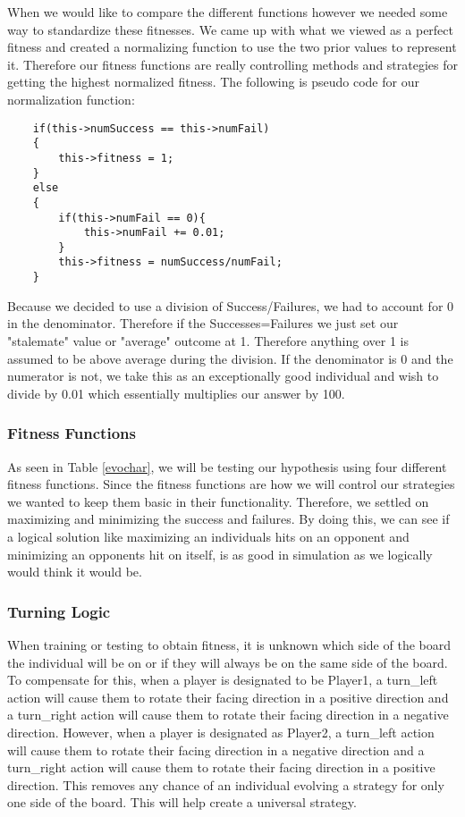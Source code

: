 \documentclass{acm_proc_article-sp}
\begin{document}
When we would like to compare the different functions however we needed some way to standardize these fitnesses. We came up with what we viewed as a perfect fitness and created a normalizing function to use the two prior values to represent it. Therefore our fitness functions are really controlling methods and strategies for getting the highest normalized fitness. The following is pseudo code for our normalization function:
\begin{verbatim}
    if(this->numSuccess == this->numFail)
    {
        this->fitness = 1;
    }
    else
    {
        if(this->numFail == 0){
            this->numFail += 0.01;
        }
        this->fitness = numSuccess/numFail;
    }
\end{verbatim}
Because we decided to use a division of Success/Failures, we had to account for 0 in the denominator. Therefore if the Successes=Failures we just set our "stalemate" value or "average" outcome at 1. Therefore anything over 1 is assumed to be above average during the division. If the denominator is 0 and the numerator is not, we take this as an exceptionally good individual and wish to divide by 0.01 which essentially multiplies our answer by 100.

\subsubsection{Fitness Functions}

As seen in Table \ref{evochar}, we will be testing our hypothesis using four different fitness functions. Since the fitness functions are how we will control our strategies we wanted to keep them basic in their functionality. Therefore, we settled on maximizing and minimizing the success and failures. By doing this, we can see if a logical solution like maximizing an individuals hits on an opponent and minimizing an opponents hit on itself, is as good in simulation as we logically would think it would be.

\subsubsection{Turning Logic} %

When training or testing to obtain fitness, it is unknown which side of the board the individual will be on or if they will always be on the same side of the board. To compensate for this, when a player is designated to be Player1, a turn\_left action will cause them to rotate their facing direction in a positive direction and a turn\_right action will cause them to rotate their facing direction in a negative direction. However, when a player is designated as Player2, a turn\_left action will cause them to rotate their facing direction in a negative direction and a turn\_right action will cause them to rotate their facing direction in a positive direction. This removes any chance of an individual evolving a strategy for only one side of the board. This will help create a universal strategy.
\end{document}
